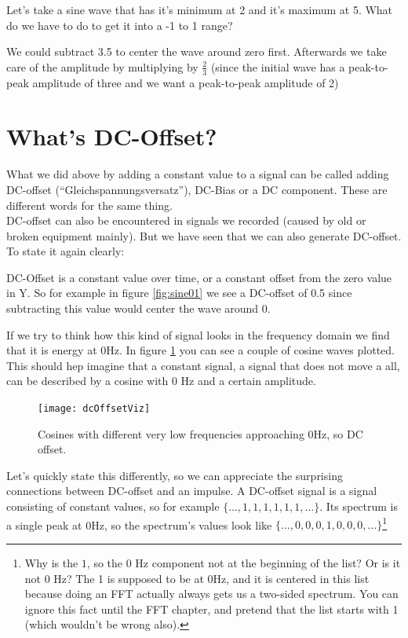 \begin{question}
Let's take a sine wave that has it's minimum at 2 and it's maximum at 5. What do we have to do to get it into a -1 to 1 range?
\end{question}
\begin{Answer}
We could subtract 3.5 to center the wave around zero first. Afterwards we take care of the amplitude by multiplying by $\frac{2}{3}$ (since the initial wave has a peak-to-peak amplitude of three and we want a peak-to-peak amplitude of 2)
\end{Answer}



\section{What's DC-Offset?}

What we did above by adding a constant value to a signal can be called adding DC-offset (``Gleichspannungsversatz''), DC-Bias or a DC component. These are different words for the same thing.\\
DC-offset can also be encountered in signals we recorded (caused by old or broken equipment mainly). But we have seen that we can also generate DC-offset.\\
To state it again clearly:
\begin{framed}
DC-Offset is a constant value over time, or a constant offset from the zero value in Y. So for example in figure \ref{fig:sine01} we see a DC-offset of 0.5 since subtracting this value would center the wave around 0.
\end{framed}
If we try to think how this kind of signal looks in the frequency domain we find that it is energy at 0Hz. In figure \ref{fig:dcViz} you can see a couple of cosine waves plotted. This should hep imagine that a constant signal, a signal that does not move a all, can be described by a cosine with 0 Hz and a certain amplitude.

\begin{figure}[h!]
	\centering
	\texttt{[image: dcOffsetViz]}
	\caption[Cosines to DC]
	{Cosines with different very low frequencies approaching 0Hz, so DC offset.}
	\label{fig:dcViz}
\end{figure}

Let's quickly state this differently, so we can appreciate the surprising connections between DC-offset and an impulse. A DC-offset signal is a signal consisting of constant values, so for example $\{...,1,1,1,1,1,1,...\}$. Its spectrum is a single peak at 0Hz, so the spectrum's values look like $\{..., 0,0,0,1,0,0,0,...\}$\footnote{Why is the $1$, so the 0 Hz component not at the beginning of the list? Or is it not 0 Hz? The 1 is supposed to be at 0Hz, and it is centered in this list because doing an FFT actually always gets us a two-sided spectrum. You can ignore this fact until the FFT chapter, and pretend that the list starts with 1 (which wouldn't be wrong also). }


